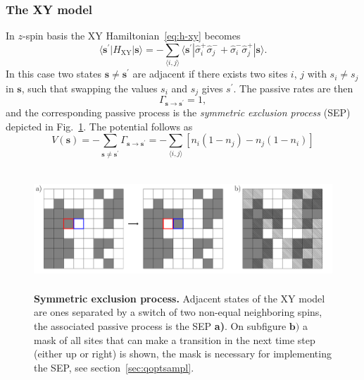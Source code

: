 \subsubsection{The XY model}
\label{subsubsec:res-hm}
In $z$-spin basis the XY Hamiltonian~\eqref{eq:h-xy} becomes
\begin{equation}
	\langle \mathbf{s}^\prime | H_{\text{XY}} | \mathbf{s} \rangle = -\sum_{\langle i, j \rangle}\langle \mathbf{s}^\prime | \hat \sigma_i^+ \hat \sigma_j^- + \hat \sigma_i^- \hat \sigma_j^+| \mathbf{s}\rangle.
\end{equation}
In this case two states $\mathbf{s} \neq \mathbf{s}^\prime$ are adjacent if there exists two sites $i$, $j$ with $s_i \neq s_j$ in $\mathbf{s}$, such that swapping the values $s_i$ and $s_j$ gives $s^\prime$. The passive rates are then
\begin{equation}
	\Gamma_{\mathbf{s}\rightarrow\mathbf{s}^\prime} = 1,
\end{equation}
and the corresponding passive process is the \emph{symmetric exclusion process} (SEP) depicted in Fig.~\ref{fig:xypassive}. The potential follows as
\begin{equation}
V(\mathbf{s}) = -\sum_{\mathbf{s} \neq \mathbf{s}^\prime} \Gamma_{\mathbf{s}\rightarrow\mathbf{s}^\prime} = -\sum_{\langle i, j \rangle} \left[n_i\left(1-n_j\right) - n_j\left(1-n_i\right)\right]
\end{equation}
\begin{figure}[t]
	\centering
	\includegraphics[height=4.5cm]{Chapter5/Figs/Vector/xy_passive}
	\caption[Symmetric exclusion process]{\textbf{Symmetric exclusion process.} Adjacent states of the XY model are ones separated by a switch of two non-equal neighboring spins, the associated passive process is the SEP \textbf{a)}. On subfigure $\mathbf{b)}$ a mask of all sites that can make a transition in the next time step (either up or right) is shown, the mask is necessary for implementing the SEP, see section~\ref{sec:qoptsampl}.}
	\label{fig:xypassive}
\end{figure}

